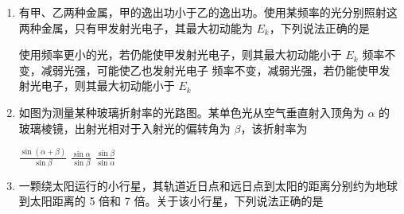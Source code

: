 \documentclass[\gkver]{gaokaozhenti}
\begin{document}
\begin{enumerate}
{D．变压器不改变交变电流的频率，变压器原、副线圈中电流的频率相同，D 错误。

故选 B。
}

\item
有甲、乙两种金属，甲的逸出功小于乙的逸出功。使用某频率的光分别照射这两种金属，只有甲发射光电子，其最大初动能为 $E_{k}$，下列说法正确的是

{使用频率更小的光，若仍能使甲发射光电子，则其最大初动能小于 $E_{k}$}
{频率不变，减弱光强，可能使乙也发射光电子}
{频率不变，减弱光强，若仍能使甲发射光电子，则其最大初动能小于 $E_{k}$}


\item
如图为测量某种玻璃折射率的光路图。某单色光从空气垂直射入顶角为 $\alpha$ 的玻璃棱镜，出射光相对于入射光的偏转角为 $\beta$，该折射率为


\fourchoices[answer=A]
{$\frac{\sin(\alpha + \beta)}{\sin\alpha}$}
{$\frac{\sin(\alpha + \beta)}{\sin\beta}$}
{$\frac{\sin\alpha}{\sin\beta}$}
{$\frac{\sin\beta}{\sin\alpha}$}


\item
一颗绕太阳运行的小行星，其轨道近日点和远日点到太阳的距离分别约为地球到太阳距离的 5 倍和 7 倍。关于该小行星，下列说法正确的是


\end{enumerate}
\end{document}
